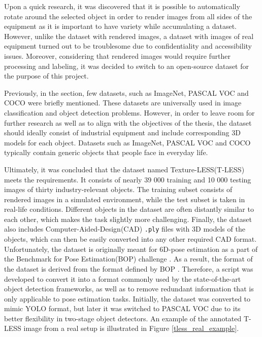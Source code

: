 \documentclass[english, 12pt, a4paper, elec, utf8, a-1b, online]{aaltothesis}
\begin{document}
Upon a quick research, it was discovered that it is possible to automatically rotate around the selected object in order to render images from all sides of the equipment as it is important to have variety while accumulating a dataset. However, unlike the dataset with rendered images, a dataset with images of real equipment turned out to be troublesome due to confidentiality and accessibility issues. Moreover, considering that rendered images would require further processing and labeling, it was decided to switch to an open-source dataset for the purpose of this project. 

Previously, in the  section, few datasets, such as ImageNet\cite{Russakovsky2014}, PASCAL VOC\cite{Everingham10} and COCO \cite{Lin2014} were briefly mentioned. These datasets are universally used in image classification and object detection problems. However, in order to leave room for further research as well as to align with the objectives of the thesis, the dataset should ideally consist of industrial equipment and include corresponding 3D models for each object. Datasets such as ImageNet, PASCAL VOC and COCO typically contain generic objects that people face in everyday life. 

Ultimately, it was concluded that the dataset named Texture-LESS(T-LESS) \cite{hodan2017tless} meets the requirements. It consists of nearly 39 000 training and 10 000 testing images of thirty industry-relevant objects. The training subset consists of rendered images in a simulated environment, while the test subset is taken in real-life conditions.  Different objects in the dataset are often distantly similar to each other, which makes the task slightly more challenging. Finally, the dataset also includes Computer-Aided-Design(CAD) \texttt{.ply} files with 3D models of the objects, which can then be easily converted into any other required CAD format. Unfortunately, the dataset is originally meant for 6D-pose estimation \cite{hodan2017tless} as a part of the Benchmark for Pose Estimation(BOP) challenge \cite{hodan2018bop}. As a result, the format of the dataset is derived from the format defined by BOP \cite{hodan2018bop_format}. Therefore, a script was developed to convert it into a format commonly used by the state-of-the-art object detection frameworks, as well as to remove redundant information that is only applicable to pose estimation tasks. Initially, the dataset was converted to mimic YOLO \cite{Redmon2015a} format, but later it was switched to PASCAL VOC due to its better flexibility in two-stage object detectors. An example of the annotated T-LESS image from a real setup is illustrated in Figure \ref{tless_real_example}. 
\end{document}
